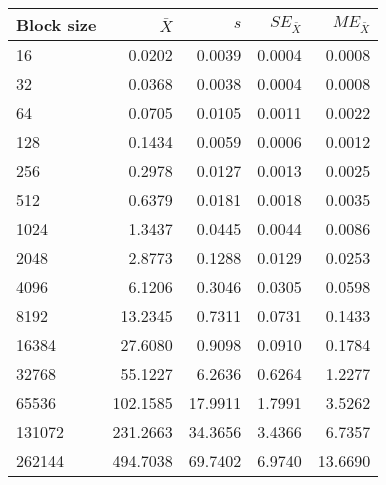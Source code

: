 \begin{tabular}{lrrrr}\toprule
{\small Block size} & $\bar{X}$ & $s$ & $SE_{\bar{X}}$ & $ME_{\bar{X}}$ \\\midrule
16 & 0.0202 & 0.0039 & 0.0004 & 0.0008\\
32 & 0.0368 & 0.0038 & 0.0004 & 0.0008\\
64 & 0.0705 & 0.0105 & 0.0011 & 0.0022\\
128 & 0.1434 & 0.0059 & 0.0006 & 0.0012\\
256 & 0.2978 & 0.0127 & 0.0013 & 0.0025\\
512 & 0.6379 & 0.0181 & 0.0018 & 0.0035\\
1024 & 1.3437 & 0.0445 & 0.0044 & 0.0086\\
2048 & 2.8773 & 0.1288 & 0.0129 & 0.0253\\
4096 & 6.1206 & 0.3046 & 0.0305 & 0.0598\\
8192 & 13.2345 & 0.7311 & 0.0731 & 0.1433\\
16384 & 27.6080 & 0.9098 & 0.0910 & 0.1784\\
32768 & 55.1227 & 6.2636 & 0.6264 & 1.2277\\
65536 & 102.1585 & 17.9911 & 1.7991 & 3.5262\\
131072 & 231.2663 & 34.3656 & 3.4366 & 6.7357\\
262144 & 494.7038 & 69.7402 & 6.9740 & 13.6690\\
\bottomrule
\end{tabular}
